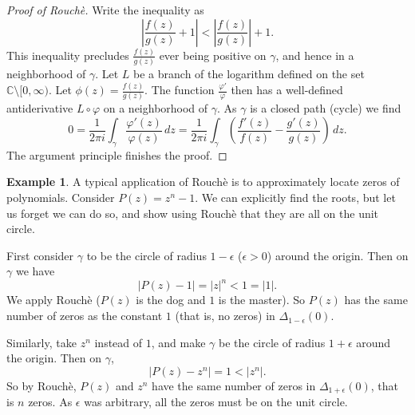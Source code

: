 \documentclass[12pt,openany]{book}
\newcommand{\sabs}[1]{\lvert {#1} \rvert}
\newcommand{\abs}[1]{\left\lvert {#1} \right\rvert}
\newcommand{\C}{{\mathbb{C}}}
\theoremstyle{plain}
\theoremstyle{remark}
\theoremstyle{definition}
\theoremstyle{exercise}
\theoremstyle{example}
\newtheorem{example}[thm]{Example}
\begin{document}
\begin{proof}[Proof of Rouch\`e]
Write the inequality as
\begin{equation*}
\abs{\frac{f(z)}{g(z)} + 1} <
\abs{\frac{f(z)}{g(z)}} + 1 .
\end{equation*}
This inequality precludes $\frac{f(z)}{g(z)}$ ever being positive on
$\gamma$, and hence in a neighborhood of $\gamma$.  Let $L$ be a branch of
the logarithm defined on the set $\C \setminus [0,\infty)$.
Let $\phi(z) = \frac{f(z)}{g(z)}$.
The function
$\frac{\varphi'}{\varphi}$ then has a well-defined antiderivative
$L \circ \varphi$ on a neighborhood of $\gamma$.  As $\gamma$
is a closed path (cycle) we find
\begin{equation*}
0
= \frac{1}{2\pi i} \int_{\gamma} \frac{\varphi'(z)}{\varphi(z)} \, dz
= \frac{1}{2\pi i} \int_{\gamma} \left( \frac{f'(z)}{f(z)} -
\frac{g'(z)}{g(z)} \right) \, dz .
\end{equation*}
The argument principle finishes the proof.
\end{proof}

\begin{example}
A typical application of Rouch\`e is to approximately locate zeros of
polynomials.  Consider $P(z) = z^n - 1$.  We can explicitly find the roots,
but let us forget we can do so,
and show using Rouch\`e that they are all on the unit circle.

First
consider $\gamma$ to be the circle of radius $1-\epsilon$ ($\epsilon > 0$)
around the origin.  Then on $\gamma$ we have
\begin{equation*}
\abs{P(z) - 1} = \abs{z}^n < 1 = \sabs{1}.
\end{equation*}
We apply Rouch\`e ($P(z)$ is the dog and $1$ is the master).  So $P(z)$
has the same number of zeros as the constant $1$ (that is, no zeros) in
$\Delta_{1-\epsilon}(0)$.

Similarly, take $z^n$ instead of $1$, and make $\gamma$ be the circle of
radius $1+\epsilon$ around the origin.  Then on $\gamma$,
\begin{equation*}
\abs{P(z) - z^n} = 1 < \abs{z^n} .
\end{equation*}
So by Rouch\`e, $P(z)$ and $z^n$ have the same number of zeros in
$\Delta_{1+\epsilon}(0)$, that is $n$ zeros.  As $\epsilon$ was arbitrary,
all the zeros must be on the unit circle.
\end{example}
\end{document}

